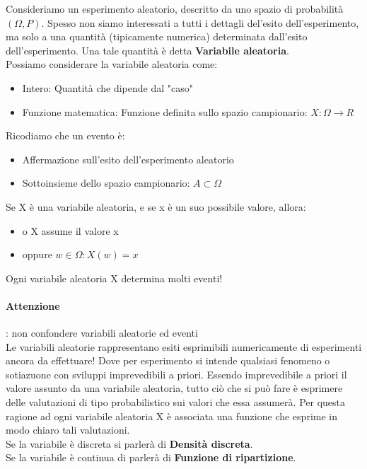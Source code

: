 \documentclass[12pt, a4paper, openany]{book}
\begin{document}
Consideriamo un esperimento aleatorio, descritto da uno spazio di probabilità $(\Omega, P)$.
Spesso non siamo interessati a tutti i dettagli del'esito dell'esperimento, ma solo a 
una quantità (tipicamente numerica) determinata dall'esito dell'esperimento.
Una tale quantità è detta \textbf{Variabile aleatoria}.
\\ Possiamo considerare la variabile aleatoria come:
\begin{itemize}
    \item Intero: Quantità che dipende dal "caso"
    \item Funzione matematica: Funzione definita sullo spazio campionario: $X: \Omega \to R$
\end{itemize}
Ricodiamo che un evento è:
\begin{itemize}
    \item Affermazione sull'esito dell'esperimento aleatorio
    \item Sottoinsieme dello spazio campionario: $A \subset \Omega$
\end{itemize}

Se X è una variabile aleatoria, e se x è un suo possibile valore, allora:
\begin{itemize}
    \item o X assume il valore x
    \item oppure ${w \in \Omega: X(w) = x }$
\end{itemize}

Ogni variabile aleatoria X determina molti eventi!
\paragraph{Attenzione}: non confondere variabili aleatorie ed eventi
\\ Le variabili aleatorie rappresentano esiti esprimibili numericamente di esperimenti
ancora da effettuare! Dove per esperimento si intende qualsiasi fenomeno o sotiazuone con sviluppi
imprevedibili a priori. Essendo imprevedibile a priori il valore assunto da una variabile
aleatoria, tutto ciò che si può fare è esprimere delle valutazioni di tipo probabilistico sui valori
che essa assumerà. Per questa ragione ad ogni variabile aleatoria X è associata una funzione che esprime
in modo chiaro tali valutazioni. 
\\Se la variabile è discreta si parlerà di \textbf{Densità discreta}.
\\Se la variabile è continua di parlerà di \textbf{Funzione di ripartizione}.
\end{document}

